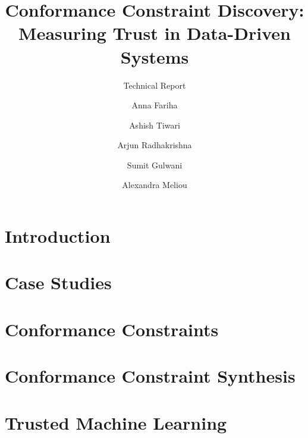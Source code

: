 \documentclass[sigconf]{acmart}
\newcommand{\DI}{Conformance Constraint\xspace}
\newcommand{\DIs}{Conformance Constraints\xspace}
\begin{document}
\title[]{Conformance Constraint Discovery: \\Measuring Trust in Data-Driven Systems}
\ifTechRep
\subtitle{Technical Report}
\fi


\author{Anna Fariha}

\author{Ashish Tiwari}
\authornotemark[2]
\author{Arjun Radhakrishna}
\author{Sumit Gulwani}

\author{Alexandra Meliou}

\renewcommand{\shortauthors}{Fariha and Tiwari, et al.}
\begin{abstract}

\end{abstract}

\maketitle
\fancyhead{}

\section{Introduction}\label{sec:introduction}


\section{Case Studies}\label{sec:casestudies}


\section{\DIs}\label{sec:data-invs}


\section{\DI Synthesis}\label{sec:synth-data-inv}



\section{Trusted Machine Learning}\label{sec:di-for-tml}

\end{document}
